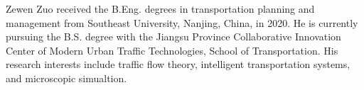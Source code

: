 \documentclass[journal]{IEEEtran}
\begin{document}
\begin{IEEEbiography}{Zewen Zuo}
  received the B.Eng. degrees in transportation planning and management from Southeast University, Nanjing, China, in 2020. He is currently pursuing the B.S. degree with the Jiangsu Province Collaborative Innovation Center of Modern Urban Traffic Technologies, School of Transportation. His research interests include traffic flow theory, intelligent transportation systems, and microscopic simualtion.
\end{IEEEbiography}

% 










\end{document}
